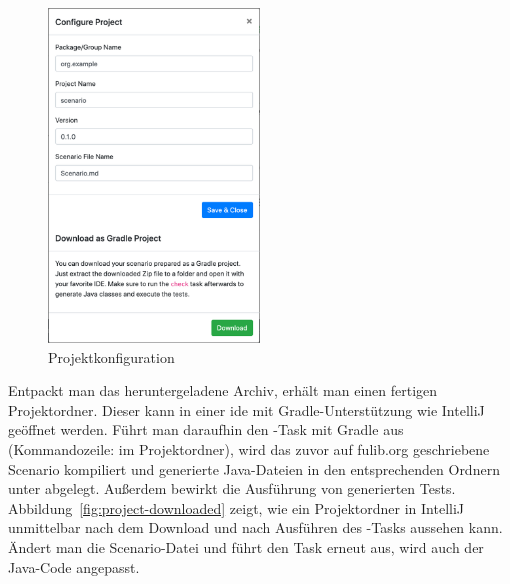 \begin{figure}
    \centering
    \includegraphics[width=0.5\textwidth]{chapter/fulib.org/img/project-config.png}
    \caption{Projektkonfiguration}
    \label{fig:project-config}
\end{figure}

Entpackt man das heruntergeladene Archiv, erhält man einen fertigen Projektordner.
Dieser kann in einer \ac{ide} mit Gradle-Unterstützung wie IntelliJ geöffnet werden.
Führt man daraufhin den -Task mit Gradle aus (Kommandozeile:  im Projektordner), wird das zuvor auf fulib.org geschriebene Scenario kompiliert und generierte Java-Dateien in den entsprechenden Ordnern unter  abgelegt.
Außerdem bewirkt  die Ausführung von generierten Tests.
Abbildung~\ref{fig:project-downloaded} zeigt, wie ein Projektordner in IntelliJ unmittelbar nach dem Download und nach Ausführen des -Tasks aussehen kann.
Ändert man die Scenario-Datei und führt den Task erneut aus, wird auch der Java-Code angepasst.

